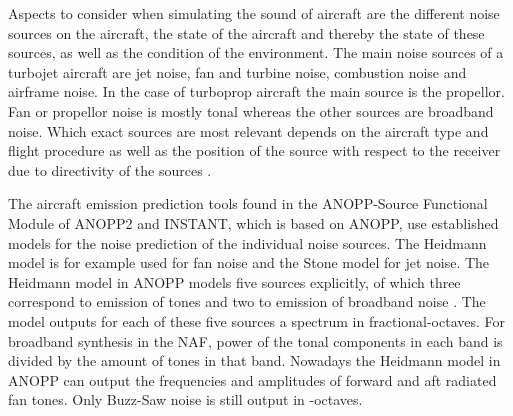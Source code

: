 Aspects to consider when simulating the sound of aircraft are the different
noise sources on the aircraft, the state of the aircraft and thereby the state
of these sources, as well as the condition of the environment.
The main noise sources of a turbojet aircraft are jet noise, fan and turbine
noise, combustion noise and airframe noise. In the case of turboprop aircraft
the main source is the propellor\cite{Zaporozhets2011}. Fan or propellor noise
is mostly tonal whereas the other sources are broadband noise.
Which exact sources are most relevant depends on the aircraft type and flight
procedure as well as the position of the source with respect to the receiver due
to directivity of the sources \cite{Bertsch2015}.

The aircraft emission prediction tools found in the ANOPP-Source Functional
Module of ANOPP2 \cite{Lopes2016, Tuttle2017} and INSTANT\cite{Sahai2016b}, which is based
on ANOPP, use established models for the noise prediction of the individual
noise sources. The Heidmann model is for example used for fan noise and the
Stone model for jet noise. The Heidmann model in ANOPP models
five sources explicitly, of which three correspond to emission of tones and two
to emission of broadband noise \cite{Arntzen2014a}. The model outputs for each
of these five sources a spectrum in fractional-octaves.
For broadband synthesis in the NAF\cite{Aumann2015}, power of the tonal
components in each band is divided by the amount of tones in that band.
Nowadays the Heidmann model in ANOPP can output the frequencies and amplitudes
of forward and aft radiated fan tones. Only Buzz-Saw noise is still output in
-octaves.


%
%
%
%
%
%
%
%


